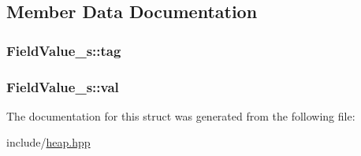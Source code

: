\subsection{Member Data Documentation}
\hypertarget{structFieldValue__s_a5ed4ddbdf09864eaf6534ef990668f7f}{
\subsubsection[{tag}]{ Field\+Value\+\_\+s\+::tag}}\label{structFieldValue__s_a5ed4ddbdf09864eaf6534ef990668f7f}
\hypertarget{structFieldValue__s_ac455e65e22ca6f532307266c8d1bbcd0}{
\subsubsection[{val}]{ Field\+Value\+\_\+s\+::val}}\label{structFieldValue__s_ac455e65e22ca6f532307266c8d1bbcd0}


The documentation for this struct was generated from the following file\+:\begin{DoxyCompactItemize}
\item 
include/\hyperlink{heap_8hpp}{heap.\+hpp}\end{DoxyCompactItemize}
